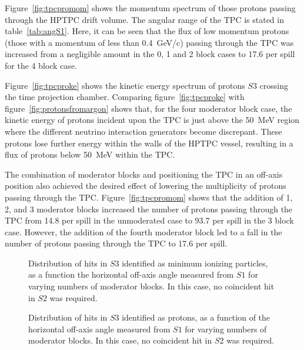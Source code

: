 Figure~\ref{fig:tpcpromom} shows the momentum spectrum of those protons passing through the HPTPC drift volume.
The angular range of the TPC is stated in table~\ref{tab:angS1}.
Here, it can be seen that the flux of low momentum protons (those with a momentum of less than 0.4~GeV/c) passing through the TPC was increased from a negligible amount in the 0, 1 and 2 block cases to 17.6 per spill for the 4 block case.

Figure~\ref{fig:tpcproke} shows the kinetic energy spectrum of protons $\mathit{S3}$ crossing the time projection chamber.
Comparing figure~\ref{fig:tpcproke} with figure~\ref{fig:protonsfromargon} shows that, for the four moderator block case, the kinetic energy of protons incident upon the TPC is just above the 50~MeV region where the different neutrino interaction generators become discrepant.
These protons lose further energy within the walls of the HPTPC vessel, resulting in a flux of protons below 50~MeV within the TPC.

The combination of moderator blocks and positioning the TPC in an off-axis position also achieved the desired effect of lowering the multiplicity of protons passing through the TPC.
Figure~\ref{fig:tpcpromom} shows that the addition of 1, 2, and 3 moderator blocks increased the number of protons passing through the TPC from 14.8 per spill in the unmoderated case to 93.7 per spill in the 3 block case.
However, the addition of the fourth moderator block led to a fall in the number of protons passing through the TPC to 17.6 per spill.
  
\begin{figure}[h]
  \begin{minipage}{0.48\textwidth}
    \begin{adjustbox}{max totalsize={\textwidth}{.35\textheight},center}
      
    \end{adjustbox}
    \caption{Distribution of hits in $\mathit{S3}$ identified as minimum ionizing particles, as a function the horizontal off-axis angle measured from $\mathit{S1}$ for varying numbers of moderator blocks. In this case, no coincident hit in $\mathit{S2}$ was required.}
    \label{fig:s1s3mips}
  \end{minipage}
  \hspace{0.3cm}
  \begin{minipage}{0.48\textwidth}
    \begin{adjustbox}{max totalsize={\textwidth}{.35\textheight},center}
      
    \end{adjustbox}
    \caption{Distribution of hits in $\mathit{S3}$ identified as protons, as a function of the horizontal off-axis angle measured from $\mathit{S1}$ for varying numbers of moderator blocks. In this case, no coincident hit in $\mathit{S2}$ was required.}
    \label{fig:s1s3protons}
  \end{minipage}
\end{figure}

